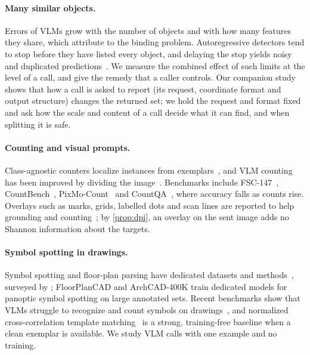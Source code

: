 \paragraph{Many similar objects.} Errors of VLMs grow with the number of objects and with how many features they share, which \citet{campbell2024binding} attribute to the binding problem. Autoregressive detectors tend to stop before they have listed every object, and delaying the stop yields noisy and duplicated predictions~\cite{chen2022pix2seq}. We measure the combined effect of such limits at the level of a call, and give the remedy that a caller controls. Our companion study~\cite{companion2026readout} shows that how a call is asked to report (its request, coordinate format and output structure) changes the returned set; we hold the request and format fixed and ask how the scale and content of a call decide what it can find, and when splitting it is safe.

\paragraph{Counting and visual prompts.} Class-agnostic counters localize instances from exemplars~\cite{amininaieni2024countgd,pelhan2026geco2}, and VLM counting has been improved by dividing the image~\cite{qharabagh2026lvlmcount}. Benchmarks include FSC-147~\cite{ranjan2021fsc147}, CountBench~\cite{paiss2023countbench}, PixMo-Count~\cite{deitke2025molmo} and CountQA~\cite{tamarapalli2025countqa}, where accuracy falls as counts rise. Overlays such as marks, grids, labelled dots and scan lines are reported to help grounding and counting~\cite{yang2023setofmark,lei2025scaffold,izadi2025viser}; by \cref{prop:dpi}, an overlay on the sent image adds no Shannon information about the targets.

\paragraph{Symbol spotting in drawings.} Symbol spotting and floor-plan parsing have dedicated datasets and methods~\cite{liu2017raster,kalervo2019cubicasa,fan2021floorplancad,luo2025archcad}, surveyed by \citet{morenogarcia2019trends}; FloorPlanCAD and ArchCAD-400K train dedicated models for panoptic symbol spotting on large annotated sets. Recent benchmarks show that VLMs struggle to recognize and count symbols on drawings~\cite{shteriyanov2025blueprintsymvl,kondratenko2026aecv,jung2026drawingvqa}, and normalized cross-correlation template matching~\cite{lewis1995fast,brunelli2009template} is a strong, training-free baseline when a clean exemplar is available. We study VLM calls with one example and no training.

